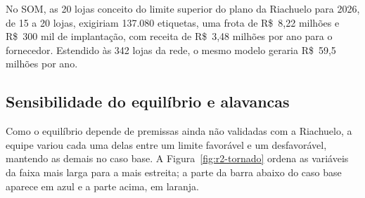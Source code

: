 No SOM, as 20 lojas conceito do limite superior do plano da Riachuelo para 2026, de 15 a 20 lojas, exigiriam 137.080 etiquetas, uma frota de R\$~8,22 milhões e R\$~300 mil de implantação, com receita de R\$~3,48 milhões por ano para o fornecedor. Estendido às 342 lojas da rede, o mesmo modelo geraria R\$~59,5 milhões por ano.

\subsection{Sensibilidade do equilíbrio e alavancas}
\label{sub:r2-sensibilidade-valor}

Como o equilíbrio depende de premissas ainda não validadas com a Riachuelo, a equipe variou cada uma delas entre um limite favorável e um desfavorável, mantendo as demais no caso base. A Figura~\ref{fig:r2-tornado} ordena as variáveis da faixa mais larga para a mais estreita; a parte da barra abaixo do caso base aparece em azul e a parte acima, em laranja.

